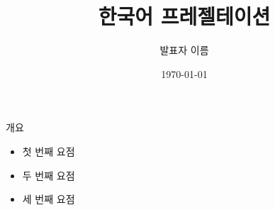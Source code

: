 \documentclass{beamer}
\title{한국어 프레젤테이션}
\author{발표자 이름}
\date{\today}
\begin{document}
\begin{frame}
  \titlepage
\end{frame}

\begin{frame}{개요}
  \begin{itemize}
    \item 첫 번째 요점
    \item 두 번째 요점
    \item 세 번째 요점
  \end{itemize}
\end{frame}
\end{document}
